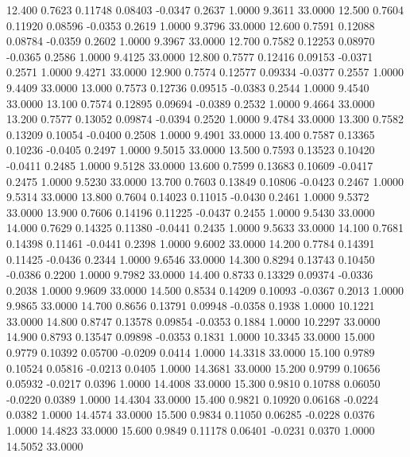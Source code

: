   12.400   0.7623   0.11748   0.08403  -0.0347   0.2637   1.0000   9.3611  33.0000
  12.500   0.7604   0.11920   0.08596  -0.0353   0.2619   1.0000   9.3796  33.0000
  12.600   0.7591   0.12088   0.08784  -0.0359   0.2602   1.0000   9.3967  33.0000
  12.700   0.7582   0.12253   0.08970  -0.0365   0.2586   1.0000   9.4125  33.0000
  12.800   0.7577   0.12416   0.09153  -0.0371   0.2571   1.0000   9.4271  33.0000
  12.900   0.7574   0.12577   0.09334  -0.0377   0.2557   1.0000   9.4409  33.0000
  13.000   0.7573   0.12736   0.09515  -0.0383   0.2544   1.0000   9.4540  33.0000
  13.100   0.7574   0.12895   0.09694  -0.0389   0.2532   1.0000   9.4664  33.0000
  13.200   0.7577   0.13052   0.09874  -0.0394   0.2520   1.0000   9.4784  33.0000
  13.300   0.7582   0.13209   0.10054  -0.0400   0.2508   1.0000   9.4901  33.0000
  13.400   0.7587   0.13365   0.10236  -0.0405   0.2497   1.0000   9.5015  33.0000
  13.500   0.7593   0.13523   0.10420  -0.0411   0.2485   1.0000   9.5128  33.0000
  13.600   0.7599   0.13683   0.10609  -0.0417   0.2475   1.0000   9.5230  33.0000
  13.700   0.7603   0.13849   0.10806  -0.0423   0.2467   1.0000   9.5314  33.0000
  13.800   0.7604   0.14023   0.11015  -0.0430   0.2461   1.0000   9.5372  33.0000
  13.900   0.7606   0.14196   0.11225  -0.0437   0.2455   1.0000   9.5430  33.0000
  14.000   0.7629   0.14325   0.11380  -0.0441   0.2435   1.0000   9.5633  33.0000
  14.100   0.7681   0.14398   0.11461  -0.0441   0.2398   1.0000   9.6002  33.0000
  14.200   0.7784   0.14391   0.11425  -0.0436   0.2344   1.0000   9.6546  33.0000
  14.300   0.8294   0.13743   0.10450  -0.0386   0.2200   1.0000   9.7982  33.0000
  14.400   0.8733   0.13329   0.09374  -0.0336   0.2038   1.0000   9.9609  33.0000
  14.500   0.8534   0.14209   0.10093  -0.0367   0.2013   1.0000   9.9865  33.0000
  14.700   0.8656   0.13791   0.09948  -0.0358   0.1938   1.0000  10.1221  33.0000
  14.800   0.8747   0.13578   0.09854  -0.0353   0.1884   1.0000  10.2297  33.0000
  14.900   0.8793   0.13547   0.09898  -0.0353   0.1831   1.0000  10.3345  33.0000
  15.000   0.9779   0.10392   0.05700  -0.0209   0.0414   1.0000  14.3318  33.0000
  15.100   0.9789   0.10524   0.05816  -0.0213   0.0405   1.0000  14.3681  33.0000
  15.200   0.9799   0.10656   0.05932  -0.0217   0.0396   1.0000  14.4008  33.0000
  15.300   0.9810   0.10788   0.06050  -0.0220   0.0389   1.0000  14.4304  33.0000
  15.400   0.9821   0.10920   0.06168  -0.0224   0.0382   1.0000  14.4574  33.0000
  15.500   0.9834   0.11050   0.06285  -0.0228   0.0376   1.0000  14.4823  33.0000
  15.600   0.9849   0.11178   0.06401  -0.0231   0.0370   1.0000  14.5052  33.0000
